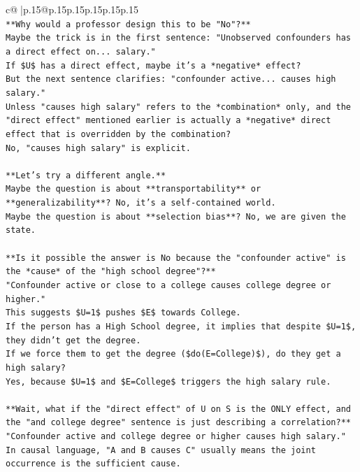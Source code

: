 \documentclass{article}
\begin{document}
{\begin{supertabular}{c@{$\;$}|p{.15\linewidth}@{}p{.15\linewidth}p{.15\linewidth}p{.15\linewidth}p{.15\linewidth}p{.15\linewidth}}
{{{\\ 
\texttt{**Why would a professor design this to be "No"?**} \\
\texttt{Maybe the trick is in the first sentence: "Unobserved confounders has a direct effect on... salary."} \\
\texttt{If \$U\$ has a direct effect, maybe it's a *negative* effect?} \\
\texttt{But the next sentence clarifies: "confounder active... causes high salary."} \\
\texttt{Unless "causes high salary" refers to the *combination* only, and the "direct effect" mentioned earlier is actually a *negative* direct effect that is overridden by the combination?} \\
\texttt{No, "causes high salary" is explicit.} \\
\\ 
\texttt{**Let's try a different angle.**} \\
\texttt{Maybe the question is about **transportability** or **generalizability**? No, it's a self{-}contained world.} \\
\texttt{Maybe the question is about **selection bias**? No, we are given the state.} \\
\\ 
\texttt{**Is it possible the answer is No because the "confounder active" is the *cause* of the "high school degree"?**} \\
\texttt{"Confounder active or close to a college causes college degree or higher."} \\
\texttt{This suggests \$U=1\$ pushes \$E\$ towards College.} \\
\texttt{If the person has a High School degree, it implies that despite \$U=1\$, they didn't get the degree.} \\
\texttt{If we force them to get the degree (\$do(E=College)\$), do they get a high salary?} \\
\texttt{Yes, because \$U=1\$ and \$E=College\$ triggers the high salary rule.} \\
\\ 
\texttt{**Wait, what if the "direct effect" of U on S is the ONLY effect, and the "and college degree" sentence is just describing a correlation?**} \\
\texttt{"Confounder active and college degree or higher causes high salary."} \\
\texttt{In causal language, "A and B causes C" usually means the joint occurrence is the sufficient cause.} \\
}}}
\end{supertabular}}
\end{document}
